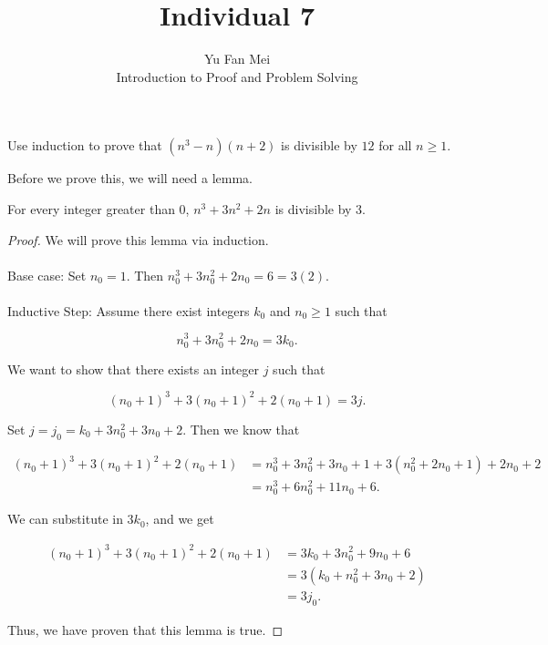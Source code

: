 \documentclass[12pt]{article}
\newenvironment{lemma}[2][Lemma]{\begin{trivlist}
\item[\hskip \labelsep {\bfseries #1}\hskip \labelsep {\bfseries #2.}]}{\end{trivlist}}
\newenvironment{problem}[2][Problem]{\begin{trivlist}
\item[\hskip \labelsep {\bfseries #1}\hskip \labelsep {\bfseries #2.}]}{\end{trivlist}}
\begin{document}

\title{Individual 7}%
\author{Yu Fan Mei\\ %
	Introduction to Proof and Problem Solving} %

\maketitle

\begin{problem}{1}
    Use induction to prove that $(n^3 - n)(n + 2)$ is divisible by $12$ for all $n \geq 1$.
\end{problem}

Before we prove this, we will need a lemma.

\begin{lemma}{1} For every integer greater than 0, $n^3 + 3n^2 + 2n$ is divisible by 3.
\end{lemma}

\begin{proof}
    We will prove this lemma via induction. \\ \\ 
    Base case: Set $n_0 = 1$. Then 
 $n_0^3 + 3n_0^2 + 2n_0 = 6 = 3(2).$ \\ \\
 \noindent
    Inductive Step: Assume there exist integers $k_0$ and $n_0 \geq 1$ such that

    $$n_0^3 + 3n_0^2 + 2n_0 = 3k_0.$$

    We want to show that there exists an integer $j$ such that

    $$(n_0+1)^3 + 3(n_0+1)^2 + 2(n_0+1) = 3j.$$

    Set $j = j_0 = k_0 + 3n_0^2 + 3n_0 + 2$. Then we know that

    \begin{align*}
        (n_0+1)^3 + 3(n_0+1)^2 + 2(n_0+1) &= n_0^3 + 3n_0^2 + 3n_0 + 1 + 3(n_0^2 + 2n_0 + 1) + 2n_0 + 2\\
        &= n_0^3 + 6n_0^2 + 11n_0 + 6.
    \end{align*}

    We can substitute in $3k_0$, and we get

    \begin{align*}
        (n_0+1)^3 + 3(n_0+1)^2 + 2(n_0+1) &= 3k_0 + 3n_0^2 + 9n_0 + 6 \\
        &= 3(k_0 + n_0^2 + 3n_0 + 2) \\
        &= 3j_0.
    \end{align*}

    Thus, we have proven that this lemma is true.
\end{proof}
\end{document}
